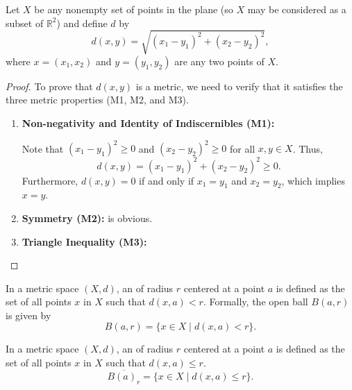 \begin{example}[Distance in $\RR^2$]
    Let \( X \) be any nonempty set of points in the plane (so \( X \) may be considered as a subset of \( \mathbb{R}^2 \)) and define \( d \) by
    \[
    d(x, y) = \sqrt{(x_1 - y_1)^2 + (x_2 - y_2)^2},
    \]
    where \( x = (x_1, x_2) \) and \( y = (y_1, y_2) \) are any two points of \( X \).
\end{example}

\begin{proof}
To prove that \( d(x, y) \) is a metric, we need to verify that it satisfies the three metric properties (M1, M2, and M3).

\begin{enumerate}
    \item \textbf{Non-negativity and Identity of Indiscernibles (M1):}
    
    Note that \( (x_1 - y_1)^2 \geq 0 \) and \( (x_2 - y_2)^2 \geq 0 \) for all \( x, y \in X \). Thus,
    \[
    d(x, y) = (x_1 - y_1)^2 + (x_2 - y_2)^2 \geq 0.
    \]
    Furthermore, \( d(x, y) = 0 \) if and only if \( x_1 = y_1 \) and \( x_2 = y_2 \), which implies \( x = y \).
    
    \item \textbf{Symmetry (M2):} is obvious.  
    \item \textbf{Triangle Inequality (M3):}
\end{enumerate}
\end{proof}

\begin{definition}
    In a metric space \( (X, d) \), an  of radius \( r \) centered at a point \( a \) is defined as the set of all points \( x \) in \( X \) such that \( d(x, a) < r \). Formally, the open ball \( B(a, r) \) is given by
    \[
    B(a, r) = \{ x \in X \mid d(x, a) < r \}.
    \]
\end{definition}


\begin{definition}
    In a metric space \( (X, d) \), an  of radius \( r \) centered at a point \( a \) is defined as the set of all points \( x \) in \( X \) such that \( d(x, a) \leq r \).
    \[
    \overline{B(a)_r} = \{ x \in X \mid d(x, a) \leq r \}.
    \]
\end{definition}

